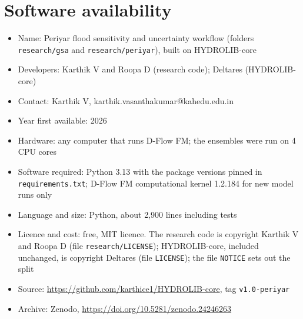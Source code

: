 \documentclass[preprint,12pt,authoryear]{elsarticle}
\begin{document}
\section*{Software availability}
{\sloppy
\begin{itemize}
\item Name: Periyar flood sensitivity and uncertainty workflow (folders \texttt{research/gsa} and \texttt{research/periyar}), built on HYDROLIB-core
\item Developers: Karthik V and Roopa D (research code); Deltares (HYDROLIB-core)
\item Contact: Karthik V, karthik.vasanthakumar@kahedu.edu.in
\item Year first available: 2026
\item Hardware: any computer that runs D-Flow FM; the ensembles were run on 4 CPU cores
\item Software required: Python 3.13 with the package versions pinned in \texttt{requirements.txt}; D-Flow FM computational kernel 1.2.184 for new model runs only
\item Language and size: Python, about 2,900 lines including tests
\item Licence and cost: free, MIT licence. The research code is copyright Karthik V and Roopa D (file \texttt{research/LICENSE}); HYDROLIB-core, included unchanged, is copyright Deltares (file \texttt{LICENSE}); the file \texttt{NOTICE} sets out the split
\item Source: \url{https://github.com/karthice1/HYDROLIB-core}, tag \texttt{v1.0-periyar}
\item Archive: Zenodo, \url{https://doi.org/10.5281/zenodo.24246263} \citep{karthik2026zenodo}
\end{itemize}
\par}
\end{document}
